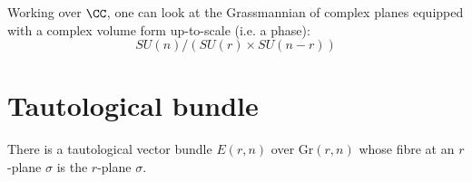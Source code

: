 \documentclass{amsart}
\begin{document}
Working over $\CC$, one can look at the Grassmannian of complex planes equipped with a complex volume form up-to-scale (i.e. a phase):
\[SU(n)/\left(SU(r)\times SU(n-r)\right)\]

\section{Tautological bundle}
\begin{Definition}[tautologicalbundle]
There is a tautological vector bundle $E(r,n)$ over $\mathrm{Gr}(r,n)$ whose fibre at an $r$-plane $\sigma$ is the $r$-plane $\sigma$.
\end{Definition}
\end{document}
